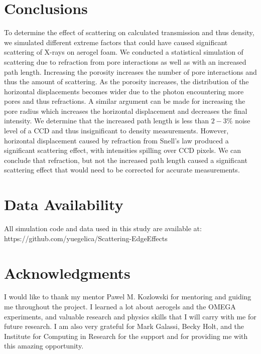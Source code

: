 \documentclass[twocolumn]{aastex701}
\begin{document}
\section{Conclusions}
To determine the effect of scattering on calculated transmission and thus density, we simulated different extreme factors that could have caused significant scattering of X-rays on aerogel foam. We conducted a statistical simulation of scattering due to refraction from pore interactions as well as with an increased path length. Increasing the porosity increases the number of pore interactions and thus the amount of scattering. As the porosity increases, the distribution of the horizontal displacements becomes wider due to the photon encountering more pores and thus refractions. A similar argument can be made for increasing the pore radius which increases the horizontal displacement and decreases the final intensity. We determine that the increased path length is less than $2-3 \%$ noise level of a CCD and thus insignificant to density measurements. However, horizontal displacement caused by refraction from Snell's law produced a significant scattering effect, with intensities spilling over CCD pixels. We can conclude that refraction, but not the increased path length caused a significant scattering effect that would need to be corrected for accurate measurements.
\section{Data Availability}

All simulation code and data used in this study are available at: https://github.com/yuegelica/Scattering-EdgeEffects

\section{Acknowledgments}

I would like to thank my mentor Pawel M. Kozlowski for mentoring and guiding me throughout the project. I learned a lot about aerogels and the OMEGA experiments, and valuable research and physics skills that I will carry with me for future research. I am also very grateful for Mark Galassi, Becky Holt, and the Institute for Computing in Research for the support and for providing me with this amazing opportunity.


\end{document}
